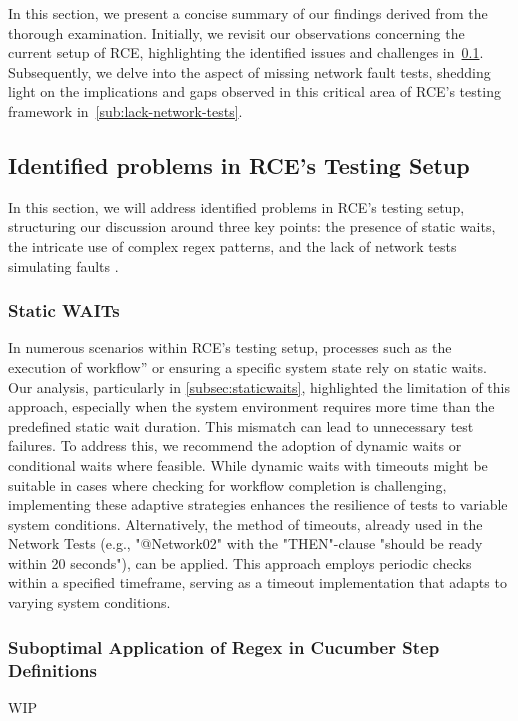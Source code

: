 In this section, we present a concise summary of our findings derived from the thorough examination. Initially, we revisit our observations concerning the current setup of RCE, highlighting the identified issues and challenges in~\cref{sub:identified-problems}. Subsequently, we delve into the aspect of missing network fault tests, shedding light on the implications and gaps observed in this critical area of RCE's testing framework in~\cref{sub:lack-network-tests}. 

\subsection{Identified problems in RCE's Testing Setup}
\label{sub:identified-problems}
In this section, we will address identified problems in RCE's testing setup, structuring our discussion around three key points: the presence of static waits, the intricate use of complex regex patterns, and the lack of network tests simulating faults
.
\subsubsection{Static WAITs}
In numerous scenarios within \ac{RCE}'s testing setup, processes such as the execution of workflow” or ensuring a specific system state rely on static waits. Our analysis, particularly in \cref{subsec:staticwaits}, highlighted the limitation of this approach, especially when the system environment requires more time than the predefined static wait duration. This mismatch can lead to unnecessary test failures. To address this, we recommend the adoption of dynamic waits or conditional waits where feasible. While dynamic waits with timeouts might be suitable in cases where checking for workflow completion is challenging, implementing these adaptive strategies enhances the resilience of tests to variable system conditions. Alternatively, the method of timeouts, already used in the Network Tests (e.g., "@Network02" with the "THEN"-clause "should be ready within 20 seconds"), can be applied. This approach employs periodic checks within a specified timeframe, serving as a timeout implementation that adapts to varying system conditions.


\subsubsection{Suboptimal Application of Regex in Cucumber Step Definitions}
\label{subsec:resultCucumber}
WIP


